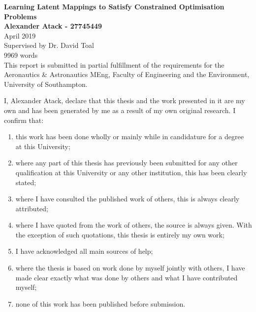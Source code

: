 \documentclass[11pt,landscape]{report}
\begin{document}
\begin{titlepage}
    \begin{center}
        \vspace*{1cm}
        \Huge\textbf{Learning Latent Mappings to Satisfy Constrained Optimisation Problems}
        \vspace{1.5cm}
        \\\Large\textbf{Alexander Atack - 27745449}
        \\\Large{April 2019}
        \vspace{1.5cm}
        \\\Large{Supervised by Dr. David Toal}
        \\\Large{9969 words}
        \vspace{1.5cm}
        \\\small{This report is submitted in partial fulfillment of the requirements for the Aeronautics \& Astronautics MEng, Faculty of Engineering and the Environment, University of Southampton.}
        \vspace{1.5cm}
    \end{center}
    \small{
        I, Alexander Atack, declare that this thesis and the work presented in it are my own and has been generated by me as a result of my own original research.
        I confirm that:
        \begin{enumerate}
            \item this work has been done wholly or mainly while in candidature for a degree at this University;
            \item where any part of this thesis has previously been submitted for any other qualification at this University or any other institution, this has been clearly stated;
            \item where I have consulted the published work of others, this is always clearly attributed;
            \item where I have quoted from the work of others, the source is always given. With the exception of such quotations, this thesis is entirely my own work;
            \item I have acknowledged all main sources of help;
            \item where the thesis is based on work done by myself jointly with others, I have made clear exactly what was done by others and what I have contributed myself;
            \item none of this work has been published before submission.
        \end{enumerate}
    }
\end{titlepage}
\end{document}
